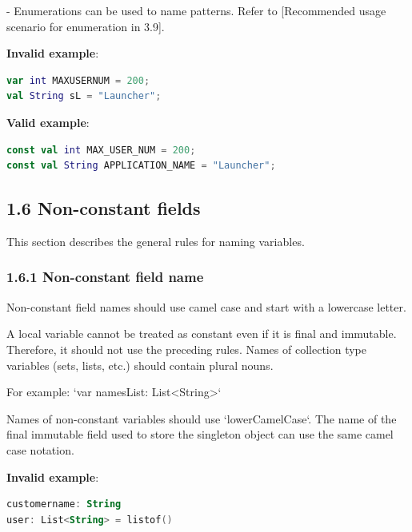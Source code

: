 - Enumerations can be used to name patterns. Refer to [Recommended usage scenario for enumeration in 3.9].



\textbf{Invalid example}: 



\begin{lstlisting}[language=Kotlin]
var int MAXUSERNUM = 200;
val String sL = "Launcher";
\end{lstlisting}


\textbf{Valid example}:



\begin{lstlisting}[language=Kotlin]
const val int MAX_USER_NUM = 200;
const val String APPLICATION_NAME = "Launcher";
\end{lstlisting}


\subsection*{\textbf{1.6 Non-constant fields}}

This section describes the general rules for naming variables.

\subsubsection*{\textbf{1.6.1 Non-constant field name}}
\leavevmode\newline

Non-constant field names should use camel case and start with a lowercase letter.

A local variable cannot be treated as constant even if it is final and immutable. Therefore, it should not use the preceding rules. Names of collection type variables (sets, lists, etc.) should contain plural nouns.

For example: `var namesList: List<String>`



Names of non-constant variables should use `lowerCamelCase`. The name of the final immutable field used to store the singleton object can use the same camel case notation.



\textbf{Invalid example}: 

\begin{lstlisting}[language=Kotlin]
customername: String
user: List<String> = listof()
\end{lstlisting}


